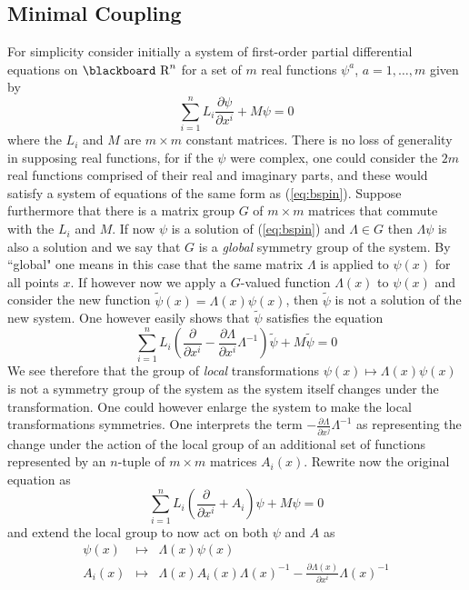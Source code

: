 \documentclass[12pt,titlepage]{article}
\def\bbf#1{\hbox{\blackboard #1}}
\def\lR{\bbf R}
\def\ppv#1#2{\frac{\partial}{\partial #1^#2}}
\begin{document}
\subsection{Minimal Coupling}\label{sec:mincoup}%
For simplicity consider initially a system of first-order partial
differential equations on \(\lR^n\) for a set of \(m\) real functions
\(\psi^a\), \(a=1,\dots,m\) given by
\begin{equation}\label{eq:bspin}%
\sum_{i=1}^n L_i\frac{\partial\psi}{\partial x^i} +M\psi = 0
\end{equation}%
where the \(L_i\) and \(M\) are \(m\times m\) constant matrices.
There is no loss of generality in supposing real functions, for if the
\(\psi\) were complex, one could consider the \(2m\) real functions
comprised of their real and imaginary parts, and these would satisfy
a system of equations of the same form as (\ref{eq:bspin}). Suppose
furthermore that there is a matrix group \(G\) of \(m\times m\) matrices
that commute with the \(L_i\) and \(M\). If now \(\psi\) is a solution
of (\ref{eq:bspin}) and \(\Lambda \in G\) then \(\Lambda\psi\) is also a
solution and we say that \(G\) is a {\em global\/}
%
 symmetry group of the
system. By ``global" one means in this case that the same matrix
\(\Lambda\) is applied to \(\psi(x)\) for all points \(x\).  If however
now we apply a \(G\)-valued function \(\Lambda(x)\) to \(\psi(x)\) and
consider the new function \(\tilde\psi(x)=\Lambda(x)\psi(x)\), then
\(\tilde\psi\) is not a solution of the new system. One however
easily shows  that \(\tilde\psi\) satisfies the equation
\[%
\sum_{i=1}^n L_i(\ppv{x}{i}
-\frac{\partial\Lambda}{\partial x^i}\Lambda^{-1})\tilde\psi
+M\tilde\psi = 0
\]%
We see therefore that the group of {\em local\/} 
%
transformations
\(\psi(x)\mapsto\Lambda(x)\psi(x)\) is not a symmetry group of the system
as the system itself changes under the transformation. One could however
enlarge the system to make the local transformations symmetries. One
interprets the term \(-\frac{\partial\Lambda}{\partial x^j}\Lambda^{-1}\) as
representing the change under the action of the local  group
of an additional
set of functions represented by an  \(n\)-tuple  of \(m\times m\)
matrices \(A_i(x)\). Rewrite now the original equation as
\begin{equation}\label{eq:agspin}%
\sum_{i=1}^n L_i(\ppv{x}{i}+A_i)\psi +M\psi = 0
\end{equation}%
and extend the local group  to now act on both \(\psi\) and \(A\) as
\begin{eqnarray}%
\psi(x) &\mapsto & \Lambda(x)\psi(x)\\ \label{eq:urgauge}
A_i(x) &\mapsto &\Lambda(x) A_i(x) \Lambda(x)^{-1} -
\frac{\partial\Lambda(x)}{\partial x^i}\Lambda(x)^{-1}
\end{eqnarray}%
\end{document}
